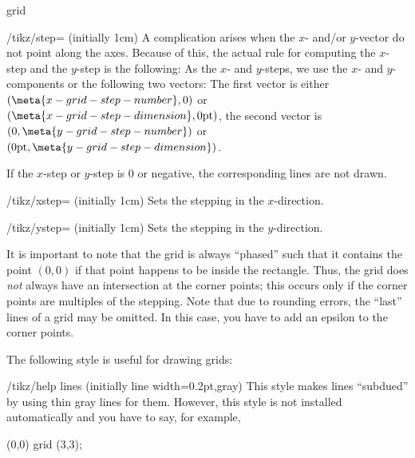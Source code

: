 \begin{pathoperation}{grid}{}
\begin{key}{/tikz/step= (initially 1cm)}
        A complication arises when the $x$- and/or $y$-vector do not point
        along the axes. Because of this, the actual rule for computing the
        $x$-step and the $y$-step is the following: As the $x$- and $y$-steps,
        we use the $x$- and $y$-components or the following two vectors: The
        first vector is either $(\meta{x-grid-step-number},0)$ or
        $(\meta{x-grid-step-dimension},0\mathrm{pt})$, the second vector is
        $(0,\meta{y-grid-step-number})$ or
        $(0\mathrm{pt},\meta{y-grid-step-dimension})$.

        If the $x$-step or $y$-step is $0$ or negative, the corresponding lines
        are not drawn.
    \end{key}

    \begin{key}{/tikz/xstep= (initially 1cm)}
        Sets the stepping in the $x$-direction.
\begin{codeexample}[]
\end{codeexample}
    \end{key}

    \begin{key}{/tikz/ystep= (initially 1cm)}
        Sets the stepping in the $y$-direction.
    \end{key}

    It is important to note that the grid is always ``phased'' such that it
    contains the point $(0,0)$ if that point happens to be inside the
    rectangle. Thus, the grid does \emph{not} always have an intersection at
    the corner points; this occurs only if the corner points are multiples of
    the stepping. Note that due to rounding errors, the ``last'' lines of a
    grid may be omitted. In this case, you have to add an epsilon to the corner
    points.

    The following style is useful for drawing grids:
    \begin{stylekey}{/tikz/help lines (initially {line width=0.2pt,gray})}
        This style makes lines ``subdued'' by using thin gray lines for them.
        However, this style is not installed automatically and you have to say,
        for example,
\begin{codeexample}[]
\tikz {} (0,0) grid (3,3);
\end{codeexample}
    \end{stylekey}
\end{pathoperation}


